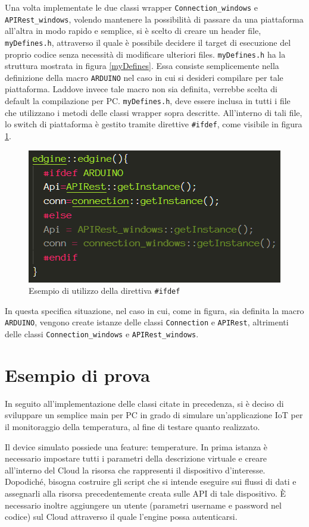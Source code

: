 Una volta implementate le due classi wrapper \texttt{Connection\_windows} e \\\texttt{APIRest\_windows}, volendo mantenere la possibilità di passare da una piattaforma all'altra in modo rapido e semplice, si è scelto di creare un header file, \texttt{myDefines.h}, attraverso il quale è possibile decidere il target di esecuzione del proprio codice senza necessità di modificare ulteriori files. \texttt{myDefines.h} ha la struttura mostrata in figura \ref{myDefines}. Essa consiste semplicemente nella definizione della macro \texttt{ARDUINO} nel caso in cui si desideri compilare per tale piattaforma. Laddove invece tale macro non sia definita, verrebbe scelta di default la compilazione per PC. \texttt{myDefines.h}, deve essere inclusa in tutti i file che utilizzano i metodi delle classi wrapper sopra descritte. All'interno di tali file, lo switch di piattaforma è gestito tramite direttive \texttt{\#ifdef}, come visibile in figura \ref{ifdef}.

\begin{figure}[H]
	\centering
	\includegraphics[width=0.66\linewidth]{pics/ifdef}
	\caption{Esempio di utilizzo della direttiva \texttt{\#ifdef}}
	\label{ifdef}
\end{figure}

In questa specifica situazione, nel caso in cui, come in figura, sia definita la macro \texttt{ARDUINO}, vengono create istanze delle classi \texttt{Connection} e \texttt{APIRest}, altrimenti delle classi \texttt{Connection\_windows} e \texttt{APIRest\_windows}.
\section{Esempio di prova}\label{prova}
In seguito all'implementazione delle classi citate in precedenza, si è deciso di sviluppare un semplice main per PC in grado di simulare un’applicazione IoT per il monitoraggio della temperatura, al fine di testare quanto realizzato.

Il device simulato possiede una feature: temperature. In prima istanza è necessario impostare tutti i parametri della descrizione virtuale e creare all'interno del Cloud la risorsa che rappresenti il dispositivo d’interesse. Dopodiché, bisogna costruire gli script che si intende eseguire sui flussi di dati e assegnarli alla risorsa precedentemente creata sulle API di tale dispositivo. È necessario inoltre aggiungere un utente (parametri username e password nel codice) sul Cloud attraverso il quale l'engine possa autenticarsi.

